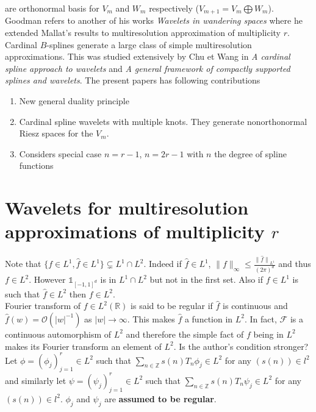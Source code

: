 \documentclass[a4paper, 11pt]{article}
\begin{document}
are orthonormal basis for $V_m$ and $W_m$ respectively ($V_{m+1} = V_m \bigoplus W_m$). Goodman refers to another of his 
works \emph{Wavelets in wandering spaces} where he extended Mallat's results to multiresolution approximation of 
multiplicity $r$. \\

Cardinal $B$-splines generate a large class of simple multiresolution approximations. This was studied extensively by 
Chu et Wang in \emph{A cardinal spline approach to wavelets} and \emph{A general framework of compactly supported 
splines and wavelets}. The present papers has following contributions
\begin{enumerate}
  \item New general duality principle
  \item Cardinal spline wavelets with multiple knots. They generate nonorthonormal Riesz spaces for the $V_m$. 
  \item Considers special case $n=r-1$, $n=2r-1$ with $n$ the degree of spline functions
\end{enumerate}

\section{Wavelets for multiresolution approximations of multiplicity $r$}

Note that $\{ f \in L^1, \hat{f} \in L^1\} \subsetneq L^1 \cap L^2$. Indeed if $\hat{f} \in L^1$, $\|f\|_{\infty} \leq 
\frac{{\|\hat{f}\|}_{L^1}}{{(2\pi)}^d}$ and thus $f \in L^2$. However $\mathds{1}_{{[-1,1]}^d}$ is in $L^1 \cap L^2$ but 
not in the first set.  Also if $f \in L^1$ is such that $\hat{f} \in L^2$ then $f \in L^2$. \\ 

Fourier transform of $f \in L^2(\mathbb{R})$ is said to be regular if $\hat{f}$ is continuous and $\hat{f}(w) = 
\mathcal{O}(|w|^{-1})$ as $|w| \to \infty$. This makes $\hat{f}$ a function in $L^2$. In fact, $\mathcal{F}$ is a 
continuous automorphism of $L^2$ and therefore the simple fact of $f$ being in $L^2$ makes its Fourier transform an 
element of $L^2$.  Is the author's condition stronger? \\

Let $\phi = {(\phi_j)}_{j=1}^r \in L^2$ such that $\sum_{n \in \mathbb{Z}} s(n) T_n \phi_j \in L^2$ for any $(s(n)) \in 
l^2$ and similarly let $\psi = {(\psi_j)}_{j=1}^r \in L^2$ such that $\sum_{n \in \mathbb{Z}} s(n) T_n \psi_j \in L^2$ 
for any $(s(n)) \in l^2$.  $\phi_j$ and $\psi_j$ are \textbf{assumed to be regular}. \\
\end{document}
